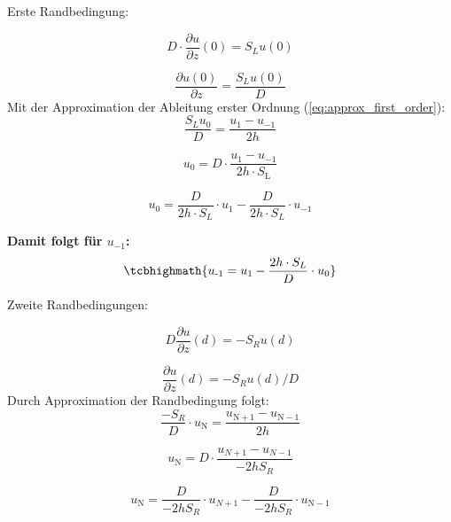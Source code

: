 Erste Randbedingung:

\begin{equation}
	D\cdot \frac{\partial u}{\partial z}(0)=S_Lu(0)
\end{equation}

\begin{equation}
	\frac{\partial u(0)}{\partial z}=\frac{S_Lu(0)}{D}
\end{equation}
Mit der Approximation der Ableitung erster Ordnung (\cref{eq:approx_first_order}):
\begin{equation}
	\frac{S_Lu_0}{D} = \frac{u_1-u_{-1}}{2h}
\end{equation}

\begin{equation}
	u_0 = D\cdot \frac{u_1-u_{-1}}{2h\cdot S_\mathrm{L}}
\end{equation}

\begin{equation}
	u_0 = \frac{D}{2h\cdot S_L} \cdot u_1 - \frac{D}{2h\cdot S_L} \cdot u_{-1}
\end{equation}

\begin{qed}
	\textbf{Damit folgt für $u_{-1}$:}
	\begin{equation}
	 \tcbhighmath{	u_{\text{-}1} = u_1 - \frac{2h\cdot S_L}{D} \cdot u_0}
	\end{equation}
\end{qed}


Zweite Randbedingungen:

\begin{equation}
	D\frac{\partial u}{\partial z}(d)=-S_Ru(d)
\end{equation}

\begin{equation}
	\frac{\partial u}{\partial z}(d)=-S_Ru(d)/D
\end{equation}
Durch Approximation der Randbedingung folgt:
\begin{equation}
	\frac{-S_R}{D}\cdot u_\mathrm{N} = \frac{u_{\mathrm{N}+1}-u_{\mathrm{N}-1}}{2h}
\end{equation}

\begin{equation}
	u_\mathrm{N} = D\cdot \frac{u_{N+1}-u_{N-1}}{-2hS_R}
\end{equation}

\begin{equation}
	u_\mathrm{N} = \frac{D}{-2hS_R} \cdot u_{N+1} - \frac{D}{-2hS_R} \cdot u_{\mathrm{N}-1}
\end{equation}

